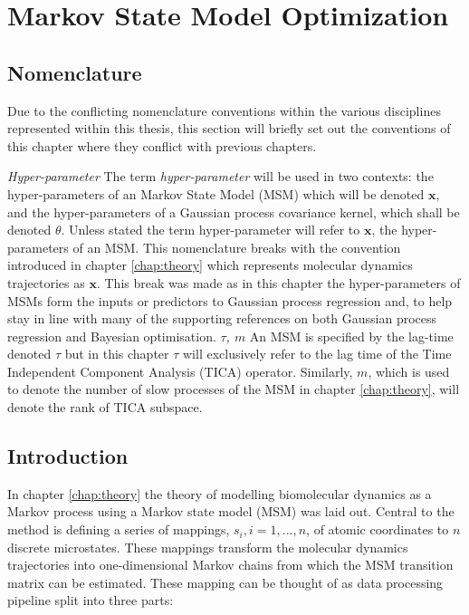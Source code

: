 \let\textcircled=\pgftextcircled
\chapter{Markov State Model Optimization}
\label{chap:msm}

\section{Nomenclature}
Due to the conflicting nomenclature conventions within the various disciplines represented within this thesis, this section will briefly set out the conventions of this chapter where they conflict with previous chapters. 

\emph{Hyper-parameter}
The term \emph{hyper-parameter} will be used in two contexts:  the hyper-parameters of an Markov State Model (MSM) which will be denoted $\mathbf{x}$, and the hyper-parameters of a Gaussian process covariance kernel, which shall be denoted $\theta$. Unless stated the term hyper-parameter will refer to $\mathbf{x}$, the hyper-parameters of an MSM. This nomenclature breaks with the convention introduced in chapter \ref{chap:theory} which represents molecular dynamics trajectories as $\mathbf{x}$. This break was made as in this chapter the hyper-parameters of MSMs form the inputs or predictors to Gaussian process regression and, to help stay in line with many of the supporting references on both Gaussian process regression and Bayesian optimisation. 
\emph{$\tau$, $m$}
An MSM is specified by the lag-time denoted $\tau$ but in this chapter $\tau$ will exclusively refer to the lag time of the Time Independent Component Analysis (TICA) operator.  Similarly, $m$, which is used to denote the number of slow processes of the MSM in chapter \ref{chap:theory}, will denote the rank of TICA subspace. 

\section{Introduction}

In chapter \ref{chap:theory} the theory of modelling biomolecular dynamics as a Markov process using a Markov state model (MSM) was laid out. Central to the method is defining  a series of mappings, $s_i, i=1, ..., n$, of atomic coordinates to $n$ discrete microstates. These mappings transform the molecular dynamics trajectories into one-dimensional Markov chains from which the MSM transition matrix can be estimated. These mapping can be thought of as data processing pipeline split into three parts: 

